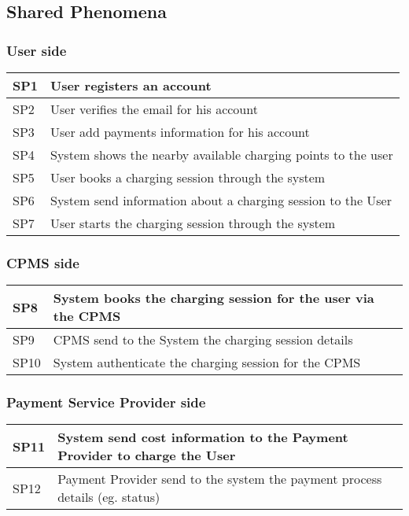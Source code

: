 \subsection{Shared Phenomena}
\subsubsection{User side}
\begin{tabular}{|l|l|}
	\hline
	SP1 & User registers an account\\
	\hline
	SP2 & User verifies the email for his account\\
	\hline
	SP3 & User add payments information for his account\\
	\hline
	SP4 & System shows the nearby available charging points to the user\\
	\hline
	SP5 & User books a charging session through the system\\
	\hline
	SP6 & System send information about a charging session to the User\\
	\hline
	SP7 & User starts the charging session through the system\\
	\hline
\end{tabular}

\subsubsection{CPMS side}
\begin{tabular}{|l|l|}
	\hline
	SP8 & System books the charging session for the user via the CPMS\\
	\hline
	SP9 & CPMS send to the System the charging session details\\
	\hline
	SP10 & System authenticate the charging session for the CPMS\\
	\hline
\end{tabular}

\subsubsection{Payment Service Provider side}
\begin{tabular}{|l|l|}
	\hline
	SP11 & System send cost information to the Payment Provider to charge the User\\
	\hline
	SP12 & Payment Provider send to the system the payment process details (eg. status)\\
	\hline
\end{tabular}\\\\

